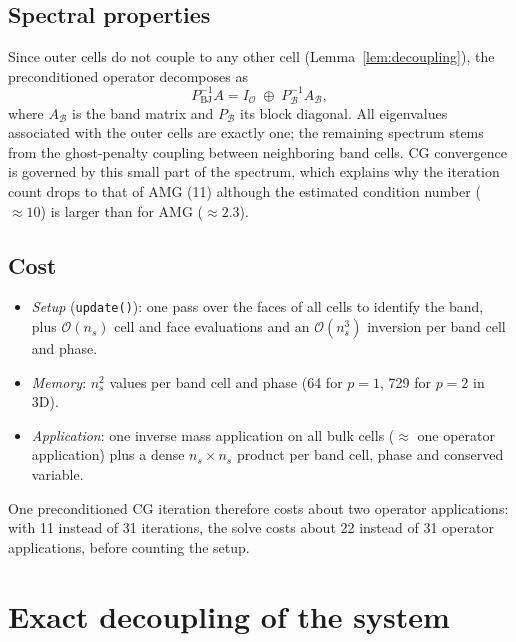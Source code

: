 \documentclass[11pt,a4paper]{article}
\newcommand{\B}{\mathcal{B}}
\newcommand{\Ou}{\mathcal{O}}
\newcommand{\PBJ}{P_{\mathrm{BJ}}}
\newcommand{\code}[1]{\nolinkurl{#1}}
\begin{document}
\subsection{Spectral properties}
Since outer cells do not couple to any other cell (Lemma~\ref{lem:decoupling}), the preconditioned
operator decomposes as
\begin{equation}
  \PBJ^{-1}A = I_{\Ou} \;\oplus\; P_{\B}^{-1}A_{\B},
  \label{eq:bj_spectrum}
\end{equation}
where $A_\B$ is the band matrix and $P_\B$ its block diagonal. All eigenvalues associated with the
outer cells are exactly one; the remaining spectrum stems from the ghost-penalty coupling between
neighboring band cells. CG convergence is governed by this small part of the spectrum, which
explains why the iteration count drops to that of AMG (11) although the estimated condition number
($\approx 10$) is larger than for AMG ($\approx 2.3$).

\subsection{Cost}
\begin{itemize}[leftmargin=*]
  \item \emph{Setup} (\code{update()}): one pass over the faces of all cells to identify the band,
        plus $\mathcal{O}(n_s)$ cell and face evaluations and an $\mathcal{O}(n_s^3)$ inversion per
        band cell and phase.
  \item \emph{Memory}: $n_s^2$ values per band cell and phase (64 for $p=1$, 729 for $p=2$ in 3D).
  \item \emph{Application}: one inverse mass application on all bulk cells ($\approx$ one operator
        application) plus a dense $n_s\times n_s$ product per band cell, phase and conserved variable.
\end{itemize}
One preconditioned CG iteration therefore costs about two operator applications: with 11 instead of
31 iterations, the solve costs about 22 instead of 31 operator applications, before counting the
setup.

\section{Exact decoupling of the system}
\label{sec:decoupling}
\end{document}
